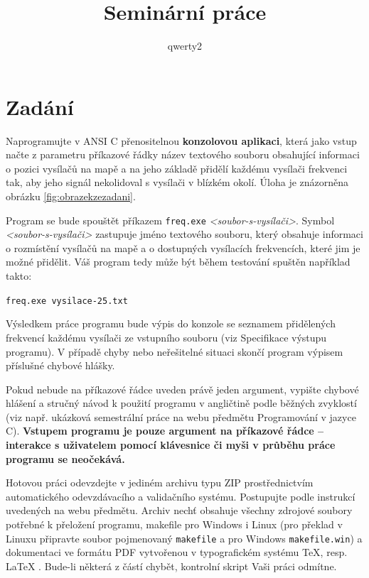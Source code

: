 \documentclass[12pt,a4paper]{article}
\title{Seminární práce }
\author{qwerty2}
\begin{document}
%
\clearpage
\thispagestyle{empty}

%
\clearpage
\tableofcontents
\clearpage
%
%
\section{Zadání}
Naprogramujte v ANSI C přenositelnou \textbf{konzolovou aplikaci}, která jako vstup načte z parametru
příkazové řádky název textového souboru obsahující informaci o pozici vysílačů na mapě a na
jeho základě přidělí každému vysílači frekvenci tak, aby jeho signál nekolidoval s vysílači v blízkém
okolí. Úloha je znázorněna obrázku \ref{fig:obrazekzezadani}.

Program se bude spouštět příkazem \texttt{freq.exe} \textit{<soubor-s-vysílači>}. Symbol \textit{<soubor-s-vysílači>}
zastupuje jméno textového souboru, který obsahuje informaci o rozmístění vysílačů na mapě a o
dostupných vysílacích frekvencích, které jim je možné přidělit.
Váš program tedy může být během testování spuštěn například takto:

\texttt{freq.exe vysilace-25.txt}

Výsledkem práce programu bude výpis do konzole se seznamem přidělených frekvencí každému
vysílači ze vstupního souboru (viz Specifikace výstupu programu). V případě chyby nebo
neřešitelné situaci skončí program výpisem příslušné chybové hlášky.

Pokud nebude na příkazové řádce uveden právě jeden argument, vypište chybové hlášení a stručný
návod k použití programu v angličtině podle běžných zvyklostí (viz např. ukázková semestrální
práce na webu předmětu Programování v jazyce C). \textbf{Vstupem programu je pouze argument
na příkazové řádce – interakce s uživatelem pomocí klávesnice či myši v průběhu
práce programu se neočekává.}

Hotovou práci odevzdejte v jediném archivu typu ZIP prostřednictvím automatického odevzdávacího
a validačního systému. Postupujte podle instrukcí uvedených na webu předmětu. Archiv nechť
obsahuje všechny zdrojové soubory potřebné k přeložení programu, makefile pro Windows i Linux
(pro překlad v Linuxu připravte soubor pojmenovaný \texttt{makefile} a pro Windows \texttt{makefile.win})
a dokumentaci ve formátu PDF vytvořenou v typografickém systému \TeX, resp. \LaTeX
. Bude-li některá z částí chybět, kontrolní skript Vaši práci odmítne.
\end{document}
